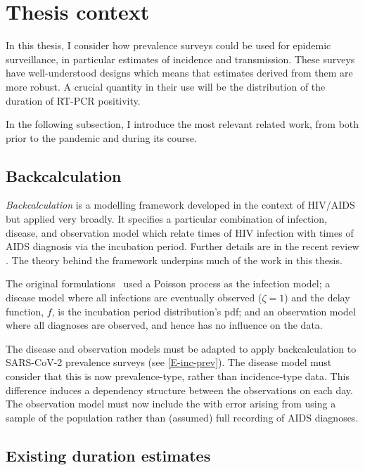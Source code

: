 \documentclass[thesis.tex]{subfiles}
\begin{document}
\section{Thesis context}

In this thesis, I consider how prevalence surveys could be used for epidemic surveillance, in particular estimates of incidence and transmission.
These surveys have well-understood designs which means that estimates derived from them are more robust.
A crucial quantity in their use will be the distribution of the duration of RT-PCR positivity.

In the following subsection, I introduce the most relevant related work, from both prior to the pandemic and during its course.

\subsection{Backcalculation}

\emph{Backcalculation} is a modelling framework developed in the context of HIV/AIDS~\autocite{brookmeyerMethod} but applied very broadly.
It specifies a particular combination of infection, disease, and observation model which relate times of HIV infection with times of AIDS diagnosis via the incubation period.
Further details are in the recent review \textcite{sunModeling}.
The theory behind the framework underpins much of the work in this thesis.

The original formulations~\autocite{brookmeyerMethod,rosenbergBackcalculation} used a Poisson process as the infection model; a disease model where all infections are eventually observed ($\zeta = 1$) and the delay function, $f$, is the incubation period distribution's pdf; and an observation model where all diagnoses are observed, and hence has no influence on the data.

The disease and observation models must be adapted to apply backcalculation to SARS-CoV-2 prevalence surveys (see \cref{E-inc-prev}).
The disease model must consider that this is now prevalence-type, rather than incidence-type data.
This difference induces a dependency structure between the observations on each day.
The observation model must now include the with error arising from using a sample of the population rather than (assumed) full recording of AIDS diagnoses.

\subsection{Existing duration estimates} \label{intro:sec:previous-duration-estimates}
\end{document}
